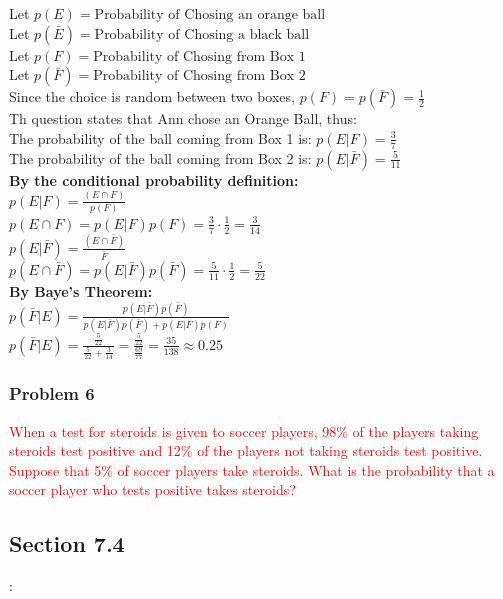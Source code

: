 \documentclass[fontsize=11pt]{scrartcl} %
\begin{document}
Let $p(E) = \text{Probability of Chosing an orange ball}$\\
Let $p(\bar E) = \text{Probability of Chosing a black ball}$\\
Let $p(F) = \text{Probability of Chosing from Box 1}$\\
Let $p(\bar F) = \text{Probability of Chosing from Box 2}$\\

Since the choice is random between two boxes,  $p(F) = p(\bar F) = \frac{1}{2}$\\

Th question states that Ann chose an Orange Ball, thus:\\
The probability of the ball coming from Box 1 is: $p(E|F) = \frac{3}{7}$\\
The probability of the ball coming from Box 2 is: $p(E|\bar F) = \frac{5}{11}$\\

\textbf{By the conditional probability definition:}\\
$p(E|F) = \frac{(E \cap F)}{p(F)}$\\
$p(E \cap F) = p(E|F)p(F) = \frac{3}{7} \cdot \frac{1}{2} = \frac{3}{14}$\\

$p(E|\bar F) = \frac{(E \cap \bar F)}{\bar F}$\\
$p(E \cap \bar F) = p(E|\bar F)p(\bar F) = \frac{5}{11} \cdot \frac{1}{2} =  \frac{5}{22}$\\

\textbf{By Baye's Theorem:}\\
$p(\bar F|E) = \frac{p(E|\bar F)p(\bar F)}{p(E|\bar F)p(\bar F) + p(E|F)p(F)}$\\

$p(\bar F|E) = \frac{\frac{5}{22}}{\frac{5}{22} + \frac{3}{14}} = \frac{\frac{5}{22}}{\frac{69}{77}} = \frac{35}{138} \approx 0.25$\\

\subsubsection*{Problem 6}
\textcolor{red}{When a test for steroids is given to soccer players, 98\% of the players taking steroids test positive and 12\% of the players not taking steroids test positive. Suppose that 5\% of soccer players take steroids. What is the probability that a soccer player who tests positive takes steroids?}\\

\subsection*{Section 7.4}:
\end{document}
